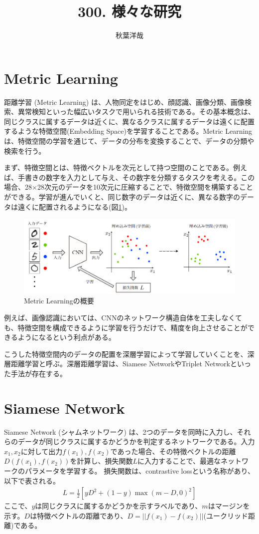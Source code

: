 \documentclass{ltjsarticle}
\begin{document}
\title{300. 様々な研究}
\author{秋葉洋哉}
\maketitle

\section{Metric Learning}
距離学習 (Metric Learning) は、人物同定をはじめ、顔認識、画像分類、画像検索、異常検知といった幅広いタスクで用いられる技術である。その基本概念は、同じクラスに属するデータは近くに、異なるクラスに属するデータは遠くに配置するような特徴空間(Embedding Space)を学習することである。Metric Learning は、特徴空間の学習を通じて、データの分布を変換することで、データの分類や検索を行う。
\par
まず、特徴空間とは、特徴ベクトルを次元として持つ空間のことである。例えば、手書きの数字を入力として与え、その数字を分類するタスクを考える。この場合、28×28次元のデータを10次元に圧縮することで、特徴空間を構築することができる。学習が進んでいくと、同じ数字のデータは近くに、異なる数字のデータは遠くに配置されるようになる(図\ref{fig:Metric_abstract})。
\begin{figure}[htbp]
  \centering
  \includegraphics[width=13cm]{./capture/Metric_abstract.png}
  \caption{Metric Learningの概要}
  \label{fig:Metric_abstract}
\end{figure}
\par
例えば、画像認識においては、CNNのネットワーク構造自体を工夫しなくても、特徴空間を構成できるように学習を行うだけで、精度を向上させることができるようになるという利点がある。
\par
こうした特徴空間内のデータの配置を深層学習によって学習していくことを、深層距離学習と呼ぶ。深層距離学習は、Siamese NetworkやTriplet Networkといった手法が存在する。

\clearpage
\section{Siamese Network}
Siamese Network (シャムネットワーク) は、2つのデータを同時に入力し、それらのデータが同じクラスに属するかどうかを判定するネットワークである。入力$x_1, x_2$に対して出力$f(x_1), f(x_2)$であった場合、その特徴ベクトルの距離$D(f(x_1), f(x_2))$を計算し、損失関数$L$に入力することで、最適なネットワークのパラメータを学習する。
損失関数は、contrastive lossという名称があり、以下で表される。
\begin{align}
  L = \frac{1}{2} \left[ yD^2 + (1-y)\max(m-D, 0)^2 \right]
\end{align}
ここで、$y$は同じクラスに属するかどうかを示すラベルであり、$m$はマージンを示す。$D$は特徴ベクトルの距離であり、$D = ||f(x_1) - f(x_2)||$(ユークリッド距離)である。
\end{document}
